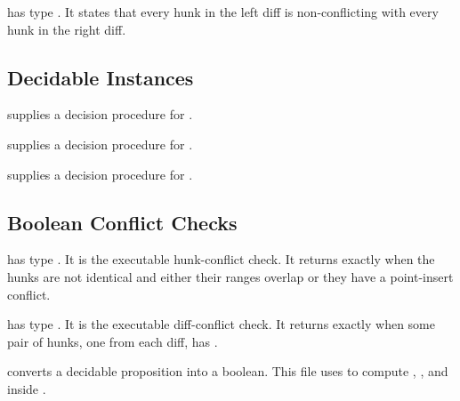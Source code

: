 \begin{definition}[compatible]
\code{[compatible]} has type . It states that every
hunk in the left diff is non-conflicting with every hunk in the right diff.
\end{definition}

\subsection{Decidable Instances}

\begin{definition}
 supplies a decision procedure for
.
\end{definition}

\begin{definition}
 supplies a decision procedure for
.
\end{definition}

\begin{definition}
 supplies a decision procedure for
.
\end{definition}

\subsection{Boolean Conflict Checks}

\begin{definition}[hunkConflictFlag]
\code{[hunkConflictFlag]} has type . It is the
executable hunk-conflict check. It returns  exactly when the hunks
are not identical and either their ranges overlap or they have a point-insert
conflict.
\end{definition}

\begin{definition}[diffConflictFlag]
\code{[diffConflictFlag]} has type . It is the
executable diff-conflict check. It returns  exactly when some pair
of hunks, one from each diff, has .
\end{definition}

\begin{definition}[decide]
\code{[decide]} converts a decidable proposition into a boolean. This file uses
 to compute , , and
 inside .
\end{definition}

